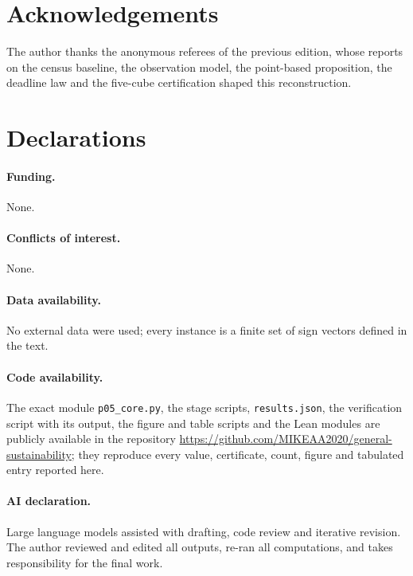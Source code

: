 \documentclass[11pt,a4paper]{article}
\theoremstyle{plain}
\theoremstyle{definition}
\theoremstyle{remark}
\begin{document}
\section*{Acknowledgements}
The author thanks the anonymous referees of the previous edition, whose reports on the census baseline, the observation model, the point-based proposition, the deadline law and the five-cube certification shaped this reconstruction.
\section*{Declarations}
\paragraph{Funding.} None.
\paragraph{Conflicts of interest.} None.
\paragraph{Data availability.} No external data were used; every instance is a finite set of sign vectors defined in the text.
\paragraph{Code availability.} The exact module \texttt{p05\_core.py}, the stage scripts, \texttt{results.json}, the verification script with its output, the figure and table scripts and the Lean modules are publicly available in the repository \url{https://github.com/MIKEAA2020/general-sustainability}; they reproduce every value, certificate, count, figure and tabulated entry reported here.
\paragraph{AI declaration.} Large language models assisted with drafting, code review and iterative revision. The author reviewed and edited all outputs, re-ran all computations, and takes responsibility for the final work.
\end{document}
